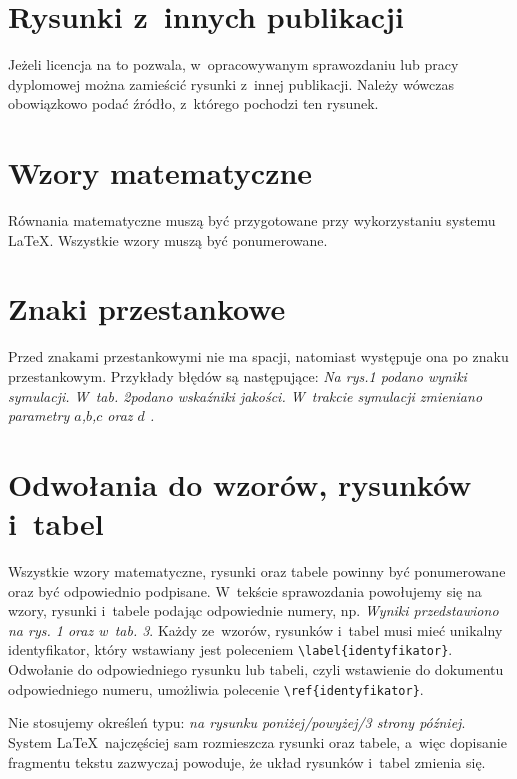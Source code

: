 \section{Rysunki z~innych publikacji}
Jeżeli licencja na to pozwala, w~opracowywanym sprawozdaniu lub pracy dyplomowej można zamieścić rysunki z~innej publikacji. Należy wówczas obowiązkowo podać źródło, z~którego pochodzi ten rysunek.

\section{Wzory matematyczne}
Równania matematyczne muszą być przygotowane przy wykorzystaniu systemu \LaTeX. Wszystkie wzory muszą być ponumerowane.

\section{Znaki przestankowe}
Przed znakami przestankowymi nie ma spacji, natomiast występuje ona po znaku przestankowym. Przykłady błędów są następujące: \emph{Na rys.1 podano wyniki symulacji. W~tab. 2podano wskaźniki jakości. W~trakcie symulacji zmieniano parametry $a$,$b$,$c$ oraz $d$ .}

\section{Odwołania do wzorów, rysunków i~tabel}
Wszystkie wzory matematyczne, rysunki oraz tabele powinny być ponumerowane oraz być odpowiednio podpisane. W~tekście sprawozdania powołujemy się na wzory, rysunki i~tabele podając odpowiednie numery, np. \emph{Wyniki przedstawiono na rys. 1 oraz w~tab. 3}. Każdy ze~wzorów, rysunków i~tabel musi mieć unikalny identyfikator, który wstawiany jest poleceniem \verb+\label{identyfikator}+. Odwołanie do odpowiedniego rysunku lub tabeli, czyli wstawienie do dokumentu odpowiedniego numeru, umożliwia polecenie \verb+\ref{identyfikator}+.

Nie stosujemy określeń typu: \emph{na rysunku poniżej/powyżej/3 strony później}. System \LaTeX \ najczęściej sam rozmieszcza rysunki oraz tabele, a~więc dopisanie fragmentu tekstu zazwyczaj powoduje, że układ rysunków i~tabel zmienia się.

